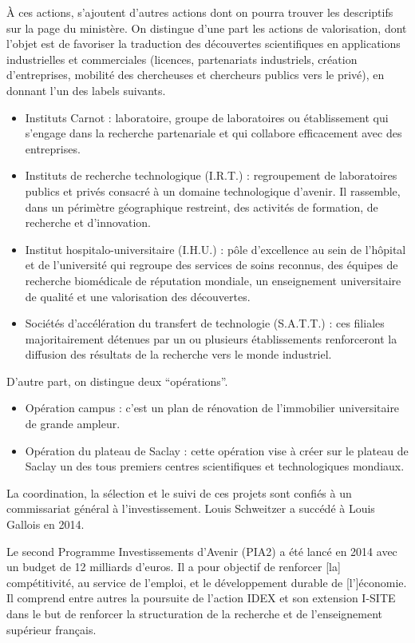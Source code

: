 \`A ces actions, s'ajoutent d'autres actions dont on pourra trouver les descriptifs sur la page du minist\`ere. 
On distingue d'une part les actions de valorisation, dont l'objet est de favoriser
la traduction des d\'ecouvertes scientifiques en applications industrielles et commerciales 
(licences, partenariats industriels, cr\'eation d'entreprises, mobilit\'e des chercheuses et chercheurs publics vers le priv\'e), 
en donnant l'un des labels suivants.
\begin{itemize}
\item Instituts Carnot : laboratoire, groupe de laboratoires ou \'etablissement qui s'engage dans la recherche partenariale 
et qui collabore efficacement avec des entreprises.
\item Instituts de recherche technologique (I.R.T.) : regroupement de laboratoires publics et priv\'es consacr\'e 
\`a un domaine technologique d'avenir. Il rassemble, dans un p\'erim\`etre g\'eographique restreint, des activit\'es de formation, 
de recherche et d'innovation.
\item Institut hospitalo-universitaire (I.H.U.) : p\^ole d'excellence au sein de l'h\^opital et de l'universit\'e 
qui regroupe des services de soins reconnus, des \'equipes de recherche biom\'edicale de r\'eputation mondiale, 
un enseignement universitaire de qualit\'e et une valorisation des d\'ecouvertes.
\item Soci\'et\'es d'acc\'el\'eration du transfert de technologie (S.A.T.T.) : 
ces filiales majoritairement d\'etenues par un ou plusieurs \'etablissements renforceront la diffusion des r\'esultats 
de la recherche vers le monde industriel.
\end{itemize}
D'autre part, on distingue deux ``op\'erations''.
\begin{itemize}
\item Op\'eration campus : c'est un plan de r\'enovation de l'immobilier universitaire de grande ampleur.
\item Op\'eration du plateau de Saclay : cette op\'eration vise \`a cr\'eer sur le plateau de Saclay 
un des tous premiers centres scientifiques et technologiques mondiaux.
\end{itemize}

La coordination, la s\'election et le suivi de ces projets sont confi\'es \`a
un commissariat g\'en\'eral \`a l'investissement. Louis Schweitzer a succ\'ed\'e \`a Louis Gallois en 2014.

Le second Programme Investissements d'Avenir (PIA2) a \'et\'e lanc\'e en 2014 avec un budget de 12 milliards
d'euros. Il a pour objectif de \og{}renforcer [la] comp\'etitivit\'e, au service de l'emploi,
et le d\'eveloppement durable de [l']\'economie.\fg{}
Il comprend entre autres la poursuite de l'action IDEX et son extension I-SITE
dans le but de renforcer la structuration de la recherche et de l'enseignement sup\'erieur fran\c cais.

